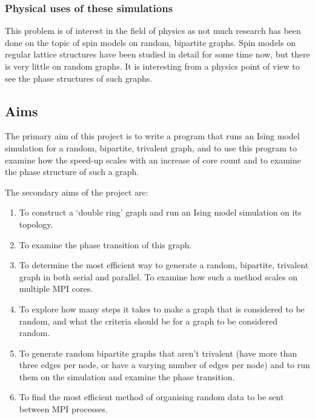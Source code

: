 \documentclass[pdftex,12pt,a4paper]{article}
\begin{document}

\subsubsection{Physical uses of these simulations}

This problem is of interest in the field of physics as not much research has been done on the topic of spin models on random, bipartite graphs. Spin models on regular lattice structures have been studied in detail for some time now, but there is very little on random graphs. It is interesting from a physics point of view to see the phase structures of such graphs.

\subsection{Aims}

The primary aim of this project is to write a program that runs an Ising model simulation for a random, bipartite, trivalent graph, and to use this program to examine how the speed-up scales with an increase of core count and to examine the phase structure of such a graph.

The secondary aims of the project are:
\begin{enumerate}
\item To construct a `double ring' graph and run an Ising model simulation on its topology.
\item To examine the phase transition of this graph.
\item To determine the most efficient way to generate a random, bipartite, trivalent graph in both serial and parallel. To examine how such a method scales on multiple MPI cores.
\item To explore how many steps it takes to make a graph that is considered to be random, and what the criteria should be for a graph to be considered random.
\item To generate random bipartite graphs that aren't trivalent (have more than three edges per node, or have a varying number of edges per node) and to run them on the simulation and examine the phase transition.
\item To find the most efficient method of organising random data to be sent between MPI processes.
\end{enumerate}

\newpage

\end{document}
